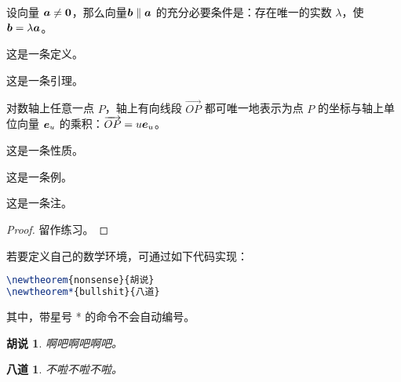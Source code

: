 \begin{theorem}
  设向量 \(\vb*{a} \neq \vb*{0}\)，那么向量\(\vb*{b} \parallel \vb*{a}\) 的充分必要条件是：存在唯一的实数 \(\lambda\)，使 \(\vb*{b} = \lambda \vb*{a}\)。
\end{theorem}
\begin{definition}
  这是一条定义。
\end{definition}
\begin{lemma}
  这是一条引理。
\end{lemma}
\begin{corollary}
  对数轴上任意一点 \(P\)，轴上有向线段 \(\overrightarrow{OP}\) 都可唯一地表示为点 \(P\) 的坐标与轴上单位向量 \(\vb*{e}_u\) 的乘积：\(\overrightarrow{OP} = u \vb*{e}_u\)。
\end{corollary}
\begin{proposition}
  这是一条性质。
\end{proposition}
\begin{example}
  这是一条例。
\end{example}
\begin{remark}
  这是一条注。
\end{remark}
\begin{proof}
  留作练习。
\end{proof}

若要定义自己的数学环境，可通过如下代码实现：
\begin{lstlisting}[language=tex]
\newtheorem{nonsense}{胡说}
\newtheorem*{bullshit}{八道}
\end{lstlisting}
其中，带星号 * 的命令不会自动编号。

\newtheorem{nonsense}{胡说}
\newtheorem*{bullshit}{八道}

\begin{nonsense}
  啊吧啊吧啊吧。
\end{nonsense}

\begin{bullshit}
  不啦不啦不啦。
\end{bullshit}